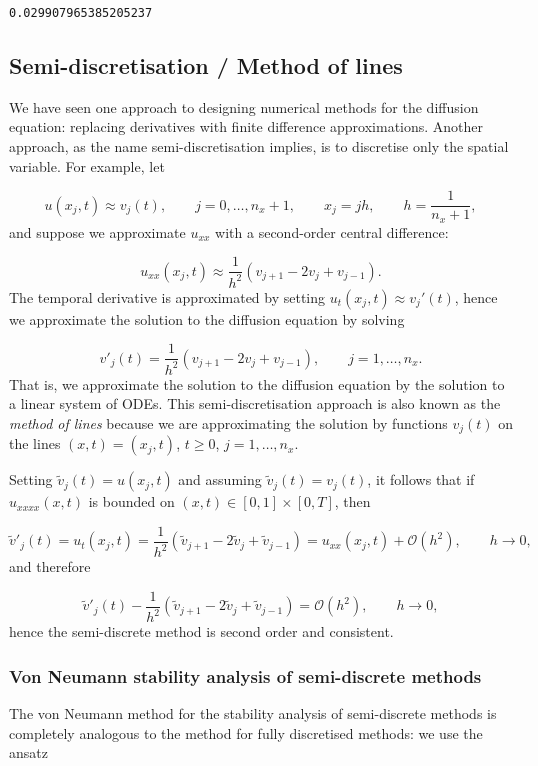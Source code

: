 \documentclass[12pt,landscape]{article}
\begin{document}
{\begin{lstlisting}
0.029907965385205237
\end{lstlisting}


\subsection{Semi-discretisation / Method of lines}
We have seen one approach to designing numerical methods for the diffusion equation: replacing derivatives with finite difference approximations.  Another approach, as the name semi-discretisation implies, is to discretise only the spatial variable.   For example, let

\[
u(x_j,t) \approx v_j(t), \qquad j  = 0, \ldots, n_x + 1, \qquad x_j = jh, \qquad h = \frac{1}{n_x + 1},
\]
and suppose we approximate $u_{xx}$ with a second-order central difference:

\[
u_{xx}(x_j,t) \approx  \frac{1}{h^2}\left(v_{j+1} - 2v_j + v_{j-1}   \right).
\]
The temporal derivative is approximated by setting $u_t(x_j,t) \approx v_j'(t)$,  hence we approximate the solution to the diffusion equation by solving

\[
v'_j(t) = \frac{1}{h^2}\left(v_{j+1} - 2v_j + v_{j-1}   \right), \qquad j  = 1, \ldots, n_x.
\]
That is, we approximate the solution to the diffusion equation by the solution to a linear system of ODEs.   This semi-discretisation approach is also known as the \emph{method of lines} because we are approximating the solution by functions $v_j(t)$ on the lines $(x,t) = (x_j,t)$, $t \geq 0$, $j = 1, \ldots, n_x$.

Setting $\tilde{v}_j(t) = u(x_j,t)$ and assuming $\tilde{v}_j(t) = v_j(t)$, it follows that if $u_{xxxx}(x,t)$ is bounded on $(x,t) \in [0,1]\times[0,T]$, then

\[
\tilde{v}'_j(t) = u_t(x_j,t) = \frac{1}{h^2}\left(\tilde{v}_{j+1} - 2\tilde{v}_j + \tilde{v}_{j-1}   \right) = u_{xx}(x_j,t) + \mathcal{O}(h^2), \qquad h \to 0,
\]
and therefore

\[
\tilde{v}'_j(t) - \frac{1}{h^2}\left(\tilde{v}_{j+1} - 2\tilde{v}_j + \tilde{v}_{j-1}   \right) = \mathcal{O}(h^2), \qquad h \to 0,
\]
hence the semi-discrete method is second order and consistent.

\subsubsection{Von Neumann stability analysis of semi-discrete methods}
The von Neumann method for the stability analysis of semi-discrete methods is completely analogous to the method for fully discretised methods: we use the ansatz

}
\end{document}
